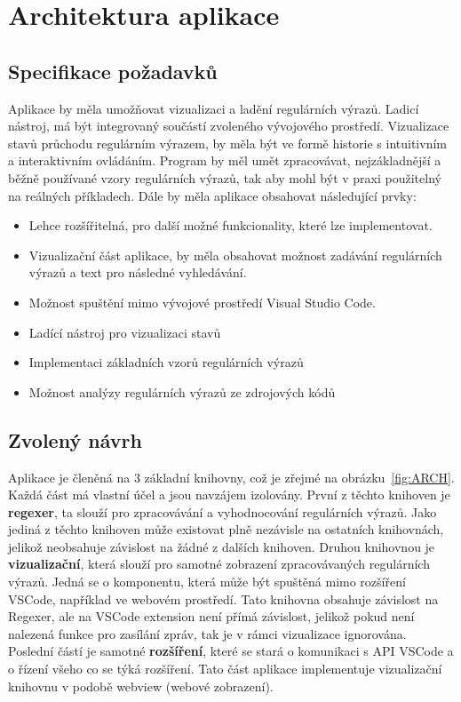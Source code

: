 \chapter{Architektura aplikace}\label{sec:ApplicationTechnology}

\section{Specifikace požadavků}

Aplikace by měla umožňovat vizualizaci a ladění regulárních výrazů.
Ladicí nástroj, má být integrovaný součástí zvoleného vývojového prostředí.
Vizualizace stavů průchodu regulárním výrazem, by měla být ve formě historie s intuitivním a interaktivním ovládáním.
Program by měl umět zpracovávat, nejzákladnější a běžně používané vzory regulárních výrazů, tak aby mohl být v praxi použitelný na reálných příkladech.
Dále by měla aplikace obsahovat následující prvky:
\begin{itemize}
	\item Lehce rozšířitelná, pro další možné funkcionality, které lze implementovat.
	\item Vizualizační část aplikace, by měla obsahovat možnost zadávání regulárních výrazů a text pro následné vyhledávání.
	\item Možnost spuštění mimo vývojové prostředí Visual Studio Code.
	\item Ladící nástroj pro vizualizaci stavů
	\item Implementaci základních vzorů regulárních výrazů
	\item Možnost analýzy regulárních výrazů ze zdrojových kódů
\end{itemize}

\section{Zvolený návrh}

Aplikace je členěná na 3 základní knihovny, což je zřejmé na obrázku~\ref{fig:ARCH}.
Každá část má vlastní účel a jsou navzájem izolovány.
První z těchto knihoven je \textbf{regexer}, ta slouží pro zpracovávání a vyhodnocování regulárních výrazů.
Jako jediná z těchto knihoven může existovat plně nezávisle na ostatních knihovnách, jelikož neobsahuje závislost na žádné z dalších knihoven.
Druhou knihovnou je \textbf{vizualizační}, která slouží pro samotné zobrazení zpracovávaných regulárních výrazů.
Jedná se o komponentu, která může být spuštěná mimo rozšíření VSCode, například ve webovém prostředí.
Tato knihovna obsahuje závislost na Regexer, ale na VSCode extension není přímá závislost, jelikož pokud není nalezená funkce pro zasílání zpráv, tak je v rámci vizualizace ignorována.
Poslední částí je samotné \textbf{rozšíření}, které se stará o komunikaci s API VSCode a o řízení všeho co se týká rozšíření.
Tato část aplikace implementuje vizualizační knihovnu v podobě webview (webové zobrazení).

